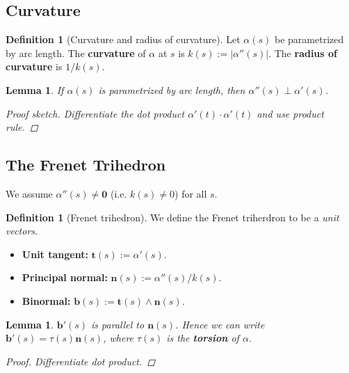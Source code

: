 \documentclass[10pt, a4paper]{article}
\theoremstyle{plain}
\newtheorem{lemma}[theorem]{Lemma}
\theoremstyle{definition}
\newtheorem{definition}[theorem]{Definition}
\theoremstyle{remark}
\begin{document}
\pagebreak

\subsection{Curvature}

\begin{definition}[Curvature and radius of curvature]
  Let $\alpha(s)$ be parametrized by arc length. The \textbf{curvature} of $\alpha$ at $s$ is $k(s):=|\alpha''(s)|$. The \textbf{radius of curvature} is $1/k(s)$.
\end{definition}

\begin{lemma}
  If $\alpha(s)$ is parametrized by arc length, then $\alpha''(s)\perp\alpha'(s)$.

  \begin{proof}[Proof sketch]
      Differentiate the dot product $\alpha'(t) \cdot \alpha'(t)$ and use product rule.
  \end{proof}
\end{lemma}


\subsection{The Frenet Trihedron}

We assume $\alpha''(s)\neq\mathbf{0}$ (i.e. $k(s) \neq 0$) for all $s$.

\begin{definition}[Frenet trihedron] We define the Frenet triherdron to be a \textit{unit vectors}.
  \begin{itemize}
    \item \textbf{Unit tangent:} $\mathbf{t}(s):=\alpha'(s)$.
    \item \textbf{Principal normal:} $\mathbf{n}(s):=\alpha''(s)/k(s)$.
    \item \textbf{Binormal:} $\mathbf{b}(s):=\mathbf{t}(s)\wedge\mathbf{n}(s)$.
  \end{itemize}
\end{definition}

\begin{lemma}
  $\mathbf{b}'(s)$ is parallel to $\mathbf{n}(s)$. Hence we can write $\mathbf{b}'(s)=\tau(s)\mathbf{n}(s)$, where $\tau(s)$ is the \textbf{torsion} of $\alpha$.


  \begin{proof}
      Differentiate dot product.
  \end{proof}
\end{lemma}
\end{document}
